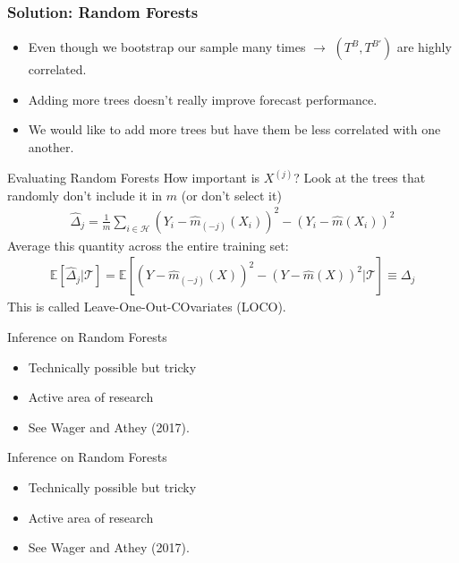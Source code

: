 \documentclass[xcolor=pdftex,dvipsnames,table,mathserif,aspectratio=169]{beamer}
\begin{document}
\begin{frame}
\frametitle{Solution: Random Forests}
\begin{itemize}
\item Even though we bootstrap our sample many times $\rightarrow$ $(T^B,T^{B'})$ are highly correlated.
\item Adding more trees doesn't really improve forecast performance.
\item We would like to add more trees but have them be \alert{less correlated} with one another.
\end{itemize}
\end{frame}

\begin{frame}{Evaluating Random Forests}
How important is $X^{(j)}$? Look at the trees that randomly don't include it in $m$ (or don't select it)
\begin{align*}
\widehat{\Delta}_{j}=\frac{1}{m} \sum_{i \in \mathcal{H}} \left(Y_{i}-\widehat{m}_{(-j)}\left(X_{i}\right)\right)^{2}-\left(Y_{i}-\widehat{m}\left(X_{i}\right)\right)^{2}
\end{align*}
Average this quantity across the entire training set:
\begin{align*}
\mathbb{E}\left[\widehat{\Delta}_{j} | \mathcal{T}\right]=\mathbb{E}\left[\left(Y-\widehat{m}_{(-j)}(X)\right)^{2}-(Y-\widehat{m}(X))^{2} | \mathcal{T}\right] \equiv \Delta_{j}
\end{align*}
This is called \alert{Leave-One-Out-COvariates} (LOCO).
\end{frame}


\begin{frame}{Inference on Random Forests}
\begin{itemize}
\item Technically possible but tricky
\item Active area of research
\item See Wager and Athey (2017).
\end{itemize}
\end{frame}


\begin{frame}{Inference on Random Forests}
\begin{itemize}
\item Technically possible but tricky
\item Active area of research
\item See Wager and Athey (2017).
\end{itemize}
\end{frame}
\end{document}
